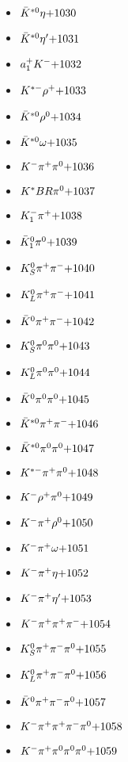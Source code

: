 \begin{multicols}{3}
\begin{itemize}
 \item $ \bar{K}^{*0} \eta \hfill{+1030}$
 \item $ \bar{K}^{*0} {\eta^{\prime}} \hfill{+1031}$
 \item $ a_{1}^{+} K^{-} \hfill{+1032}$
 \item $ K^{*-} \rho^{+} \hfill{+1033}$
 \item $ \bar{K}^{*0} \rho^{0} \hfill{+1034}$
 \item $ \bar{K}^{*0} \omega \hfill{+1035}$
 \item $ K^{-} \pi^{+} \pi^{0} \hfill{+1036}$
 \item $ K^{*}BR \pi^{0} \hfill{+1037}$
 \item $ K_{1}^{-} \pi^{+} \hfill{+1038}$
 \item $ \bar{K}_{1}^{0} \pi^{0} \hfill{+1039}$
 \item $ K_{S}^{0} \pi^{+} \pi^{-} \hfill{+1040}$
 \item $ K_{L}^{0} \pi^{+} \pi^{-} \hfill{+1041}$
 \item $ \bar{K}^{0} \pi^{+} \pi^{-} \hfill{+1042}$
 \item $ K_{S}^{0} \pi^{0} \pi^{0} \hfill{+1043}$
 \item $ K_{L}^{0} \pi^{0} \pi^{0} \hfill{+1044}$
 \item $ \bar{K}^{0} \pi^{0} \pi^{0} \hfill{+1045}$
 \item $ \bar{K}^{*0} \pi^{+} \pi^{-} \hfill{+1046}$
 \item $ \bar{K}^{*0} \pi^{0} \pi^{0} \hfill{+1047}$
 \item $ K^{*-} \pi^{+} \pi^{0} \hfill{+1048}$
 \item $ K^{-} \rho^{+} \pi^{0} \hfill{+1049}$
 \item $ K^{-} \pi^{+} \rho^{0} \hfill{+1050}$
 \item $ K^{-} \pi^{+} \omega \hfill{+1051}$
 \item $ K^{-} \pi^{+} \eta \hfill{+1052}$
 \item $ K^{-} \pi^{+} {\eta^{\prime}} \hfill{+1053}$
 \item $ K^{-} \pi^{+} \pi^{+} \pi^{-} \hfill{+1054}$
 \item $ K_{S}^{0} \pi^{+} \pi^{-} \pi^{0} \hfill{+1055}$
 \item $ K_{L}^{0} \pi^{+} \pi^{-} \pi^{0} \hfill{+1056}$
 \item $ \bar{K}^{0} \pi^{+} \pi^{-} \pi^{0} \hfill{+1057}$
 \item $ K^{-} \pi^{+} \pi^{+} \pi^{-} \pi^{0} \hfill{+1058}$
 \item $ K^{-} \pi^{+} \pi^{0} \pi^{0} \pi^{0} \hfill{+1059}$

\end{itemize}
\end{multicols}
